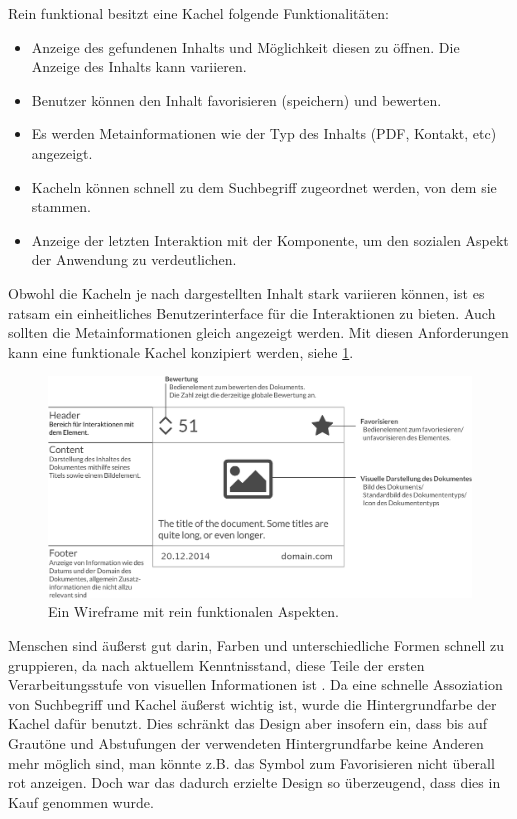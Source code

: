 \documentclass[12pt,twoside]{book}
\begin{document}
Rein funktional besitzt eine Kachel folgende Funktionalitäten:

\begin{itemize}
  \item Anzeige des gefundenen Inhalts und Möglichkeit diesen zu öffnen. Die Anzeige des Inhalts kann variieren.
  \item Benutzer können den Inhalt favorisieren (speichern) und bewerten.
  \item Es werden Metainformationen wie der Typ des Inhalts (PDF, Kontakt, etc) angezeigt.
  \item Kacheln können schnell zu dem Suchbegriff zugeordnet werden, von dem sie stammen.
  \item Anzeige der letzten Interaktion mit der Komponente, um den sozialen Aspekt der Anwendung zu verdeutlichen.
\end{itemize}

Obwohl die Kacheln je nach dargestellten Inhalt stark variieren können, ist es ratsam ein einheitliches Benutzerinterface für die Interaktionen zu bieten. Auch sollten die Metainformationen gleich angezeigt werden.
Mit diesen Anforderungen kann eine funktionale Kachel konzipiert werden, siehe \ref{fig:tile_prototype}.

\begin{figure}[htbp]
    \centering
    \includegraphics[width=1.0\textwidth]{images/tiles.eps}
    \caption{Ein Wireframe mit rein funktionalen Aspekten.}
    \label{fig:tile_prototype}
\end{figure}

Menschen sind äußerst gut darin, Farben und unterschiedliche Formen schnell zu gruppieren, da nach aktuellem Kenntnisstand, diese Teile der ersten Verarbeitungsstufe von visuellen Informationen ist \citep{treisman1987merkmale}. Da eine schnelle Assoziation von Suchbegriff und Kachel äußerst wichtig ist, wurde die Hintergrundfarbe der Kachel dafür benutzt. Dies schränkt das Design aber insofern ein, dass bis auf Grautöne und Abstufungen der verwendeten Hintergrundfarbe keine Anderen mehr möglich sind, man könnte z.B. das Symbol zum Favorisieren nicht überall rot anzeigen. Doch war das dadurch erzielte Design so überzeugend, dass dies in Kauf genommen wurde.
\end{document}
